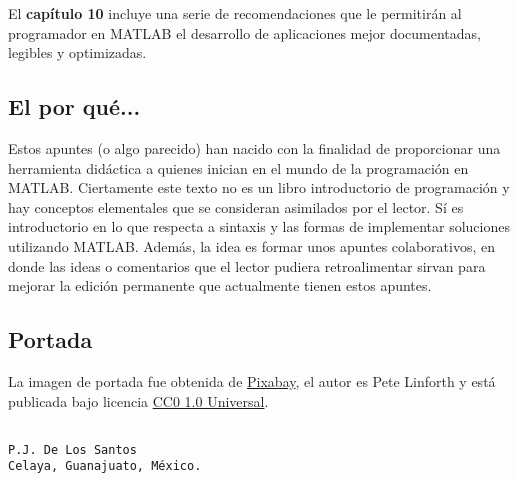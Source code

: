 El \textbf{capítulo 10} incluye una serie de recomendaciones que le
permitirán al programador en MATLAB el desarrollo de aplicaciones mejor
documentadas, legibles y optimizadas. \\

\subsection*{El por qué...}

Estos apuntes (o algo parecido) han nacido con la finalidad de
proporcionar una herramienta didáctica a quienes inician en el mundo de
la programación en MATLAB. Ciertamente este texto no es un libro
introductorio de programación y hay conceptos elementales que se
consideran asimilados por el lector. Sí es introductorio en lo que
respecta a sintaxis y las formas de implementar soluciones utilizando
MATLAB. Además, la idea es formar unos apuntes colaborativos, en donde
las ideas o comentarios que el lector pudiera retroalimentar sirvan para
mejorar la edición permanente que actualmente tienen estos apuntes.

\subsection*{Portada}

La imagen de portada fue obtenida de
\href{https://pixabay.com/es/nano-tecnolog\%C3\%ADa-construcci\%C3\%B3n-1480553/}{Pixabay},
el autor es Pete Linforth y está publicada bajo licencia
\href{https://creativecommons.org/publicdomain/zero/1.0/deed.es}{CC0 1.0
Universal}.


\begin{verbatim}

P.J. De Los Santos
Celaya, Guanajuato, México.
\end{verbatim}

